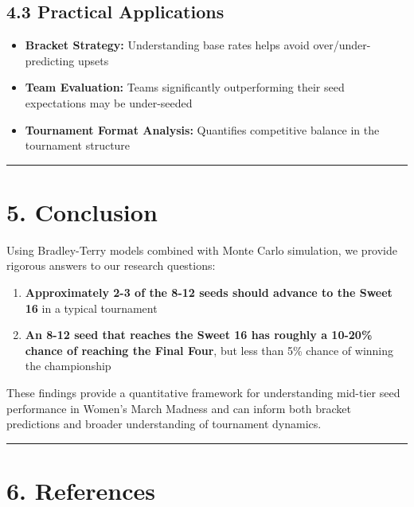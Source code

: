 \documentclass[
]{article}
\providecommand{\tightlist}{%
  \setlength{\itemsep}{0pt}\setlength{\parskip}{0pt}}
\begin{document}
\subsection{4.3 Practical Applications}\label{practical-applications}

\begin{itemize}
\tightlist
\item
  \textbf{Bracket Strategy:} Understanding base rates helps avoid
  over/under-predicting upsets
\item
  \textbf{Team Evaluation:} Teams significantly outperforming their seed
  expectations may be under-seeded
\item
  \textbf{Tournament Format Analysis:} Quantifies competitive balance in
  the tournament structure
\end{itemize}

\begin{center}\rule{0.5\linewidth}{0.5pt}\end{center}

\section{5. Conclusion}\label{conclusion}

Using Bradley-Terry models combined with Monte Carlo simulation, we
provide rigorous answers to our research questions:

\begin{enumerate}
\def\labelenumi{\arabic{enumi}.}
\tightlist
\item
  \textbf{Approximately 2-3 of the 8-12 seeds should advance to the
  Sweet 16} in a typical tournament
\item
  \textbf{An 8-12 seed that reaches the Sweet 16 has roughly a 10-20\%
  chance of reaching the Final Four}, but less than 5\% chance of
  winning the championship
\end{enumerate}

These findings provide a quantitative framework for understanding
mid-tier seed performance in Women's March Madness and can inform both
bracket predictions and broader understanding of tournament dynamics.

\begin{center}\rule{0.5\linewidth}{0.5pt}\end{center}

\section{6. References}\label{references}
\end{document}
